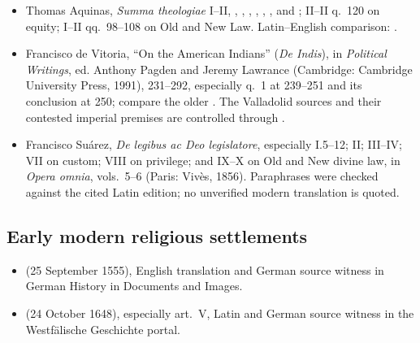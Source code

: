 \begin{itemize}
\item Thomas Aquinas, \emph{Summa theologiae} I--II, , , , , , , and ; II--II q.~120 on equity; I--II qq.~98--108 on Old and New Law. Latin--English comparison: .
\item Francisco de Vitoria, ``On the American Indians'' (\emph{De Indis}), in \emph{Political Writings}, ed. Anthony Pagden and Jeremy Lawrance (Cambridge: Cambridge University Press, 1991), 231--292, especially q.~1 at 239--251 and its conclusion at 250; compare the older . The Valladolid sources and their contested imperial premises are controlled through .
\item Francisco Su\'arez, \emph{De legibus ac Deo legislatore}, especially I.5--12; II; III--IV; VII on custom; VIII on privilege; and IX--X on Old and New divine law, in \emph{Opera omnia}, vols.~5--6 (Paris: Viv\`es, 1856). Paraphrases were checked against the cited Latin edition; no unverified modern translation is quoted.
\end{itemize}

\subsection{Early modern religious settlements}

\begin{itemize}
\item {} (25 September 1555), English translation and German source witness in German History in Documents and Images.
\item {} (24 October 1648), especially art.~V, Latin and German source witness in the Westf\"alische Geschichte portal.
\end{itemize}

